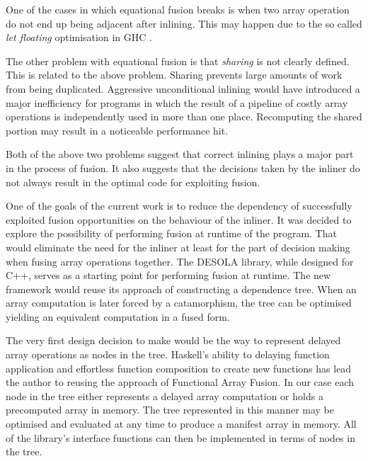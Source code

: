 \documentclass[preamble.tex]{subfiles}
\begin{document}
One of the cases in which equational fusion breaks is when two array operation do not end up being adjacent after inlining. This may happen due to the so called \emph{let floating} optimisation in GHC \cite{PPS96}.


The other problem with equational fusion is that \emph{sharing} is not clearly defined. This is related to the above problem. Sharing prevents large amounts of work from being duplicated. Aggressive unconditional inlining would have introduced a major inefficiency for programs in which the result of a pipeline of costly array operations is independently used in more than one place. Recomputing the shared portion may result in a noticeable performance hit.

Both of the above two problems suggest that correct inlining plays a major part in the process of fusion. It also suggests that the decisions taken by the inliner do not always result in the optimal code for exploiting fusion. 

One of the goals of the current work is to reduce the dependency of successfully exploited fusion opportunities on the behaviour of the inliner. It was decided to explore the possibility of performing fusion at runtime of the program. That would eliminate the need for the inliner at least for the part of decision making when fusing array operations together. The DESOLA library, while designed for C++, serves as a starting point for performing fusion at runtime. The new framework would reuse its approach of constructing a dependence tree. When an array computation is later forced by a catamorphism, the tree can be optimised yielding an equivalent computation in a fused form.

The very first design decision to make would be the way to represent delayed array operations as nodes in the tree. Haskell's ability to delaying function application and effortless function composition to create new functions has lead the author to reusing the approach of Functional Array Fusion. In our case each node in the tree either represents a delayed array computation or holds a precomputed array in memory. The tree represented in this manner may be optimised and evaluated at any time to produce a manifest array in memory. All of the library's interface functions can then be implemented in terms of nodes in the tree.
\end{document}
